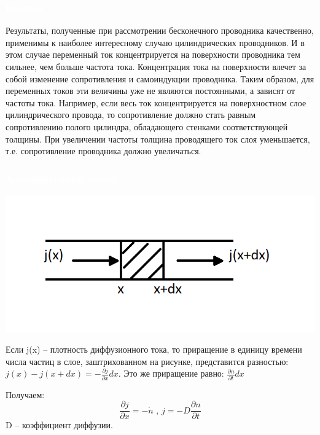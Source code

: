 \documentclass[aspectratio=169]{beamer}
\begin{document}
\begin{frame}
\frametitle{\textcolor{white}{Выводы}}
Результаты, полученные при рассмотрении бесконечного проводника качественно, применимы к наиболее интересному случаю цилиндрических проводников. И в этом случае переменный ток концентрируется на поверхности проводника тем сильнее, чем больше частота тока. Концентрация тока на поверхности влечет за собой изменение сопротивления и самоиндукции проводника. Таким образом, для переменных токов эти величины уже не являются постоянными, а зависят от частоты тока. Например, если весь ток концентрируется на поверхностном слое цилиндрического провода, то сопротивление должно стать равным сопротивлению полого цилиндра, обладающего стенками соответствующей толщины. При увеличении частоты толщина проводящего ток слоя уменьшается, т.е. сопротивление проводника должно увеличаться.
\end{frame}

\begin{frame}
\frametitle{\textcolor{white}{Альтернативный вывод}}
\begin{center}
\includegraphics[scale=0.5]{02.png}
\end{center}

Если j(x) -- плотность диффузионного тока, то приращение в единицу времени числа частиц в слое, заштрихованном на рисунке, представится разностью:
$j(x) - j(x+dx) = -\frac{\partial j}{\partial x} dx$. Это же приращение равно: $\frac{\partial n}{\partial t} dx$

Получаем:
\begin{equation*}
\frac{\partial j}{\partial x} = - \dot n \text{  ,  }j = - D \frac{\partial n}{\partial t}
\end{equation*}
D -- коэффициент диффузии.
\end{frame}
\end{document}
